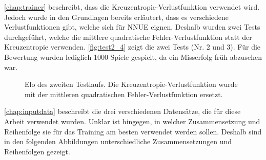 
\autoref{chap:trainer} beschreibt, dass die Kreuzentropie-Verlustfunktion verwendet wird. Jedoch wurde in den Grundlagen bereits erläutert, dass es verschiedene Verlustfunktionen gibt, welche sich für \ac{NNUE} eignen. Deshalb wurden zwei Tests durchgeführt, welche die mittlere quadratische Fehler-Verlustfunktion statt der Kreuzentropie verwenden. \autoref{fig:test2_4} zeigt die zwei Tests (Nr. 2 und 3). Für die Bewertung wurden lediglich 1000 Spiele gespielt, da ein Misserfolg früh abzusehen war.

\begin{figure}
  \centering
  \caption{Elo des zweiten Testlaufs. Die Kreuzentropie-Verlustfunktion wurde mit der mittleren quadratischen Fehler-Verlustfunktion ersetzt.}
  \label{fig:test2_4}
\end{figure}

\autoref{chap:inputdata} beschreibt die drei verschiedenen Datensätze, die für diese Arbeit verwendet wurden. Unklar ist hingegen, in welcher Zusammensetzung und Reihenfolge sie für das Training am besten verwendet werden sollen. Deshalb sind in den folgenden Abbildungen unterschiedliche Zusammensetzungen und Reihenfolgen gezeigt.

